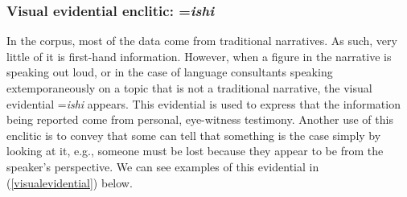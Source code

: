\subsubsection{Visual evidential enclitic: =\textit{ishi}}
\largerpage
In the corpus, most of the data come from traditional narratives. As such, very little of it is first-hand information. However, when a figure in the narrative is speaking out loud, or in the case of language consultants speaking extemporaneously on a topic that is not a traditional narrative, the visual evidential =\textit{ishi} appears. This evidential is used to express that the information being reported come from personal, eye-witness testimony. Another use of this enclitic is to convey that some can tell that something is the case simply by looking at it, e.g., someone must be lost because they appear to be from the speaker's perspective. We can see examples of this evidential in (\ref{visualevidential}) below.

